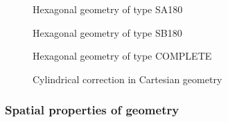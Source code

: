 \begin{figure}[!]  
\begin{center} 
\epsfxsize=5cm
\centerline{ }
\parbox{14cm}{\caption{Hexagonal geometry of type SA180}\label{fig:sa180}}   
\end{center}  
\end{figure}

\begin{figure}[!]  
\begin{center} 
\epsfxsize=11cm
\centerline{ }
\parbox{14cm}{\caption{Hexagonal geometry of type SB180}\label{fig:sb180}}   
\end{center}  
\end{figure}

\begin{figure}[!]  
\begin{center} 
\epsfxsize=10cm
\centerline{ }
\parbox{14cm}{\caption{Hexagonal geometry of type
COMPLETE}\label{fig:compl}}    
\end{center}  
\end{figure}

\begin{figure}[!]
\begin{center} 
\epsfxsize=6cm
\centerline{ }
\parbox{14cm}{\caption{Cylindrical correction in Cartesian geometry}
\label{fig:corr}} 
\end{center} 
\end{figure}

\clearpage
\subsubsection{Spatial properties of geometry}\label{sect:descSP}
                                                  
